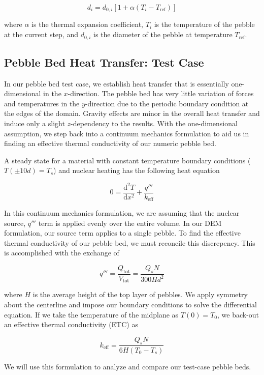 \begin{equation}
	d_i = d_{0,i}\left[1+\alpha\left(T_i - T_\text{ref}\right)\right]
\end{equation}

where $\alpha$ is the thermal expansion coefficient, $T_i$ is the temperature of the pebble at the current step, and $d_{0,i}$ is the diameter of the pebble at temperature $T_\text{ref}$.






\subsection{Pebble Bed Heat Transfer: Test Case}
In our pebble bed test case, we establish heat transfer that is essentially one-dimensional in the $x$-direction. The pebble bed has very little variation of forces and temperatures in the $y$-direction due to the periodic boundary condition at the edges of the domain. Gravity effects are minor in the overall heat transfer and induce only a slight $z$-dependency  to the results. With the one-dimensional assumption, we step back into a continuum mechanics formulation to aid us in finding an effective thermal conductivity of our numeric pebble bed. 

A steady state for a material with constant temperature boundary conditions ($T(\pm 10d) = T_s$) and nuclear heating has the following heat equation

\begin{equation}\label{eq:continuum-heateqn}
	0 = \frac{\mathrm{d}^2T}{\mathrm{d}x^2} + \frac{q'''}{k_\text{eff}}
\end{equation}

In this continuum mechanics formulation, we are assuming that the nuclear source, $q'''$ term is applied evenly over the entire volume. In our DEM formulation, our source term applies to a single pebble. To find the effective thermal conductivity of our pebble bed, we must reconcile this discrepency. This is accomplished  with the exchange of

\begin{equation}
	q''' = \frac{Q_\text{tot}}{V_\text{tot}} = \frac{Q_sN}{300Hd^2}
\end{equation}

where $H$ is the average height of the top layer of pebbles. We apply symmetry about the centerline and impose our boundary conditions to solve the differential equation. If we take the temperature of the midplane as $T(0) = T_0$, we back-out an effective thermal conductivity (ETC) as

\begin{equation}\label{eq:etc}
	k_\text{eff} = \frac{Q_sN}{6H(T_0-T_s)}
\end{equation}


We will use this formulation to analyze and compare our test-case pebble beds.



